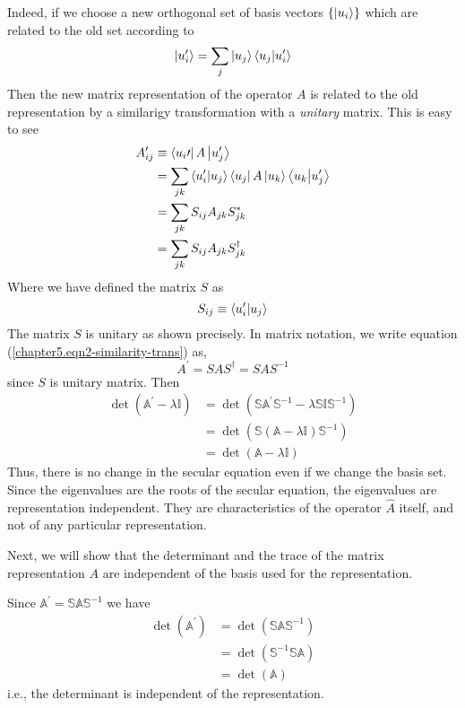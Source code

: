 	
	Indeed, if we choose a new orthogonal set of basis vectors $\{\ket{u_i}\}$ which are related to the old set according to 
	\begin{equation}
		\ket{u_i^\prime} = \sum_j \ket{u_j}\braket{u_j}{u_i^\prime}
	\end{equation}
	Then the new matrix representation of the operator $A$ is related to the old representation by a similarigy transformation with a \textit{unitary} matrix. This is easy to see
	\begin{eqnarray}
		A_{ij}^\prime 
		&\equiv \bra{u_i\prime} A \ket{u_j^\prime} \nonumber\\
		&= \sum_{jk} \braket{u_i^\prime}{u_j}\bra{u_j}A\ket{u_k}\braket{u_k}{u_j^\prime} \nonumber\\
		&= \sum_{jk} S_{ij} A_{jk} S_{jk}^* \nonumber\\
		&= \sum_{jk} S_{ij} A_{jk} S_{jk}^\dagger
		\label{chapter5.eqn2-similarity-trans}
	\end{eqnarray}
	Where we have defined the matrix $S$ as
	\begin{equation}
		S_{ij} \equiv \braket{u_i^\prime}{u_j}
	\end{equation}
	The matrix $S$ is unitary as shown precisely. In matrix notation, we write equation (\ref{chapter5.eqn2-similarity-trans}) as,
	\begin{equation}
		A^\prime = S A S^\dagger = S A S^{-1}
	\end{equation}
	since $S$ is unitary matrix. Then
	\begin{eqnarray}
		\det(\mathbb{A}^\prime - \lambda \mathbb{I}) 
		&= \det(\mathbb{S}\mathbb{A}^\prime \mathbb{S}^{-1} - \lambda \mathbb{S} \mathbb{I} \mathbb{S}^{-1}) \nonumber \\
		&= \det(\mathbb{S}(\mathbb{A} - \lambda \mathbb{I}) \mathbb{S}^{-1})\nonumber \\
		&= \det(\mathbb{A} - \lambda \mathbb{I})
	\end{eqnarray}
	Thus, there is no change in the secular equation even if we change the basis set. Since the eigenvalues are the roots of the secular equation, the eigenvalues are representation independent. They are characteristics of the operator $\hat{A}$ itself, and not of any particular representation.
	
	

	Next, we will show that the determinant and the trace of the matrix representation $A$ are independent of the basis used for the representation.
	
	Since $\mathbb{A}^\prime = \mathbb{S} \mathbb{A} \mathbb{S}^{-1}$ we have 
	\begin{eqnarray}
		\det(\mathbb{A}^\prime) 
		&= \det(\mathbb{S} \mathbb{A} \mathbb{S}^{-1}) \nonumber \\
		&= \det(\mathbb{S}^{-1}\mathbb{S} \mathbb{A} ) \nonumber \\
		&= \det(\mathbb{A})
	\end{eqnarray}
	i.e., the determinant is independent of the representation.
	
